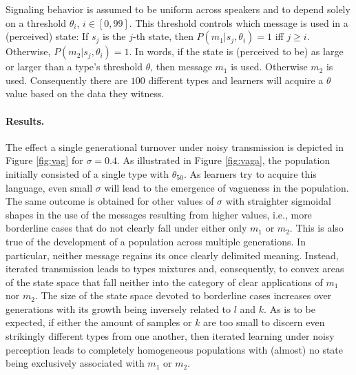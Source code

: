 \documentclass[10pt,a4paper]{article}
\begin{document}
Signaling behavior is assumed to be uniform across speakers and to depend solely on a threshold $\theta_i$, $i \in [0,99]$. This threshold controls which message is used in a (perceived) state: If $s_j$ is the $j$-th state, then $P(m_1|s_j,\theta_i) = 1$ iff $j \geq i$. Otherwise, $P(m_2|s_j,\theta_i) = 1$. In words, if the state is (perceived to be) as large or larger than a type's threshold $\theta$, then message $m_1$ is used. Otherwise $m_2$ is used. Consequently there are $100$ different types and learners will acquire a $\theta$ value based on the data they witness.

\paragraph{Results.} The effect a single generational turnover under noisy transmission is depicted in Figure \ref{fig:vag} for $\sigma = 0.4$. As illustrated in Figure \ref{fig:vaga}, the population initially consisted of a single type with $\theta_{50}$. As learners try to acquire this language, even small $\sigma$ will lead to the emergence of vagueness in the population. The same outcome is obtained for other values of $\sigma$ with straighter sigmoidal shapes in the use of the messages resulting from higher values, i.e., more borderline cases that do not clearly fall under either only $m_1$ or $m_2$. This is also true of the development of a population across multiple generations. In particular, neither message regains its once clearly delimited meaning. Instead, iterated transmission leads to types mixtures and, consequently, to convex areas of the state space that fall neither into the category of clear applications of $m_1$ nor $m_2$. The size of the state space devoted to borderline cases increases over generations with its growth being inversely related to $l$ and $k$. As is to be expected, if either the amount of samples or $k$ are too small to discern even strikingly different types from one another, then iterated learning under noisy perception leads to completely homogeneous populations with (almost) no state being exclusively associated with $m_1$ or $m_2$.
\end{document}
